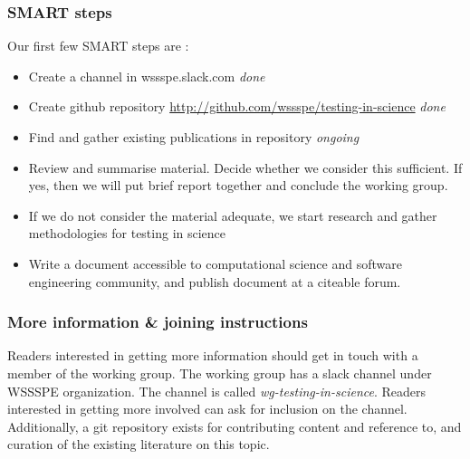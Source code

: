 


\subsubsection{SMART steps}

Our first few SMART steps are : 
\begin{itemize}
\item Create a channel in wssspe.slack.com {\em done}
\item Create github repository
  {\url{http://github.com/wssspe/testing-in-science}} {\em done}
\item Find and gather existing publications in repository {\em ongoing}
\item Review and summarise material. Decide whether we consider this
  sufficient. If yes, then we will put brief report together and
  conclude the working group.
\item If we do not consider the material adequate, we start research
  and gather methodologies for testing in science 
\item Write a document accessible to computational science and
  software engineering community, and publish document at a citeable forum.
\end{itemize}

\subsubsection{More information \& joining instructions}

Readers interested in getting more information should get in touch
with a member of the working group. The working group
has a slack channel under WSSSPE organization. The channel is called
{\it wg-testing-in-science}. Readers interested in getting more
involved can ask for inclusion on the channel. Additionally, a git
repository exists for contributing content and reference to, and
curation of the existing literature on this topic.
